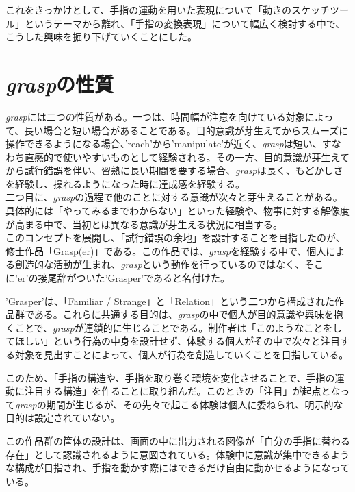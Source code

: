 これをきっかけとして、手指の運動を用いた表現について「動きのスケッチツール」というテーマから離れ、「手指の変換表現」について幅広く検討する中で、こうした興味を掘り下げていくことにした。\\

\section{\textit{grasp}の性質}
\textit{grasp}には二つの性質がある。一つは、時間幅が注意を向けている対象によって、長い場合と短い場合があることである。目的意識が芽生えてからスムーズに操作できるようになる場合、'reach'から'manipulate'が近く、\textit{grasp}は短い、すなわち直感的で使いやすいものとして経験される。その一方、目的意識が芽生えてから試行錯誤を伴い、習熟に長い期間を要する場合、\textit{grasp}は長く、もどかしさを経験し、操れるようになった時に達成感を経験する。\\

二つ目に、\textit{grasp}の過程で他のことに対する意識が次々と芽生えることがある。具体的には「やってみるまでわからない」といった経験や、物事に対する解像度が高まる中で、当初とは異なる意識が芽生える状況に相当する。\\

このコンセプトを展開し、「試行錯誤の余地」を設計することを目指したのが、修士作品「Grasp(er)」である。この作品では、\textit{grasp}を経験する中で、個人による創造的な活動が生まれ、\textit{grasp}という動作を行っているのではなく、そこに'er'の接尾辞がついた'Grasper'であると名付けた。

'Grasper'は、「Familiar / Strange」と「Relation」という二つから構成された作品群である。これらに共通する目的は、\textit{grasp}の中で個人が目的意識や興味を抱くことで、\textit{grasp}が連鎖的に生じることである。制作者は「このようなことをしてほしい」という行為の中身を設計せず、体験する個人がその中で次々と注目する対象を見出すことによって、個人が行為を創造していくことを目指している。

このため、「手指の構造や、手指を取り巻く環境を変化させることで、手指の運動に注目する構造」を作ることに取り組んだ。このときの「注目」が起点となって\textit{grasp}の期間が生じるが、その先々で起こる体験は個人に委ねられ、明示的な目的は設定されていない。

この作品群の筐体の設計は、画面の中に出力される図像が「自分の手指に替わる存在」として認識されるように意図されている。体験中に意識が集中できるような構成が目指され、手指を動かす際にはできるだけ自由に動かせるようになっている。